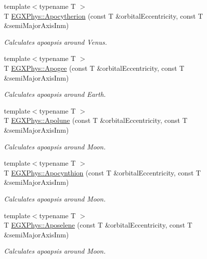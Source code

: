 \begin{DoxyCompactItemize}
{\footnotesize template$<$typename T $>$ }\\T \mbox{\hyperlink{group___e_g_x_phys-_apoapsis_ga75bd80071f792bd75d609fec8dca17b1}{E\+G\+X\+Phys\+::\+Apocytherion}} (const T \&orbital\+Eccentricity, const T \&semi\+Major\+Axis\+Inm)
\begin{DoxyCompactList}\small\item\em Calculates apoapsis around Venus. \end{DoxyCompactList}\item 
{\footnotesize template$<$typename T $>$ }\\T \mbox{\hyperlink{group___e_g_x_phys-_apoapsis_ga5bb3b3a83de372ffaf9af3ab77d6f408}{E\+G\+X\+Phys\+::\+Apogee}} (const T \&orbital\+Eccentricity, const T \&semi\+Major\+Axis\+Inm)
\begin{DoxyCompactList}\small\item\em Calculates apoapsis around Earth. \end{DoxyCompactList}\item 
{\footnotesize template$<$typename T $>$ }\\T \mbox{\hyperlink{group___e_g_x_phys-_apoapsis_gac82e5aebcf63e5113ddefe648f40ef2e}{E\+G\+X\+Phys\+::\+Apolune}} (const T \&orbital\+Eccentricity, const T \&semi\+Major\+Axis\+Inm)
\begin{DoxyCompactList}\small\item\em Calculates apoapsis around Moon. \end{DoxyCompactList}\item 
{\footnotesize template$<$typename T $>$ }\\T \mbox{\hyperlink{group___e_g_x_phys-_apoapsis_ga44b6d3e3280b5a59e1cfb53b65673075}{E\+G\+X\+Phys\+::\+Apocynthion}} (const T \&orbital\+Eccentricity, const T \&semi\+Major\+Axis\+Inm)
\begin{DoxyCompactList}\small\item\em Calculates apoapsis around Moon. \end{DoxyCompactList}\item 
{\footnotesize template$<$typename T $>$ }\\T \mbox{\hyperlink{group___e_g_x_phys-_apoapsis_gaf13528a3ed48f6e85f4ba5735edc1163}{E\+G\+X\+Phys\+::\+Aposelene}} (const T \&orbital\+Eccentricity, const T \&semi\+Major\+Axis\+Inm)
\begin{DoxyCompactList}\small\item\em Calculates apoapsis around Moon. \end{DoxyCompactList}\item 

\end{DoxyCompactItemize}
